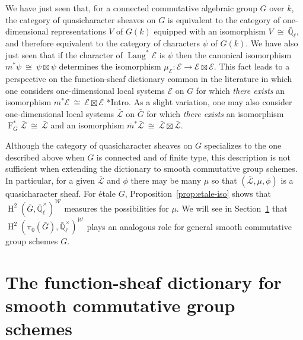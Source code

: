 \documentclass[CM,Submssn,SecEq]{degruyter-crelle} %
\theoremstyle{plain}
\theoremstyle{definition}
\theoremstyle{remark}
\newtheorem{remark}[theorem]{Remark}
\newcommand{\EE}{\mathbb{\bar Q}_\ell}
\newcommand{\Fq}{k}
\newcommand{\EEx}{\EE^\times}
\newcommand{\Weil}[1]{\mathcal{W}_{#1}}
\newcommand{\Frob}[1]{\operatorname{F}_{#1}}
\DeclareMathOperator{\Hh}{H}
\DeclareMathOperator{\Lang}{Lang}
\newcommand{\iso}{{\ \cong\ }}
\newcommand{\qcs}[1]{{\mathcal{#1}}}
\newcommand{\gqcs}[1]{{\mathcal{\bar #1}}}
\newcommand{\bm}{\bar{m}}
\newcommand{\bG}{\bar{G}}
\begin{document}
We have just seen that, for a connected commutative algebraic group $G$ over $\Fq$, the category of quasicharacter sheaves on $G$ is equivalent to the category of one-dimensional representations $V$ of $G(\Fq)$ equipped with an isomorphism $V\iso \EE$, and therefore equivalent to the category of characters $\psi$ of $G(\Fq)$.
We have also just seen that if the character of $\Lang^*\qcs{E}$ is $\psi$ then the canonical isomorphism $m^*\psi \iso \psi \boxtimes \psi$ determines the isomorphism $\mu_\qcs{E} : \qcs{E} \to \qcs{E}\boxtimes\qcs{E}$.
This fact leads to a perspective on the function-sheaf dictionary common in the literature in which one considers one-dimensional local systems $\qcs{E}$ on $G$ for which \emph{there exists} an isomorphism $m^*\qcs{E} \iso \qcs{E} \boxtimes\qcs{E}$ \cite{kamgarpour:09a}*{Intro}.
As a slight variation, one may also consider one-dimensional local systems $\gqcs{L}$ on $\bG$ for which \emph{there exists} an isomorphism $\Frob{G}^*\gqcs{L} \iso \gqcs{L}$ and an isomorphism $\bm^*\gqcs{L} \iso \gqcs{L} \boxtimes\gqcs{L}$.

Although the category of quasicharacter sheaves on $G$ specializes to the one described above when $G$ is connected and of finite type, this description is not sufficient when extending the dictionary to smooth commutative group schemes. 
In particular, for a given $\gqcs{L}$ and $\phi$ there may be many $\mu$ so that $(\gqcs{L},\mu,\phi)$ is a quasicharacter sheaf.  For \'etale $G$, Proposition~\ref{prop:etale-iso} shows that $\Hh^2(\bG,\EEx)^{\Weil{}}$ measures the possibilities for $\mu$.  We will see in Section~\ref{sec:main} that $\Hh^2(\pi_0(\bG),\EEx)^{\Weil{}}$ plays an analogous role for general smooth commutative group schemes $G$.

\section{The function-sheaf dictionary for smooth commutative group schemes}\label{sec:main}
\end{document}
